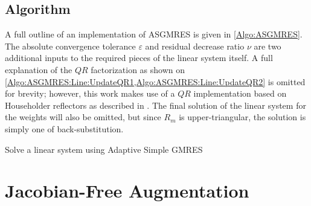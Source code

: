 \documentclass[12pt]{UWMadThesis}
\begin{document}
\subsection{Algorithm}

A full outline of an implementation of ASGMRES is given in \cref{Algo:ASGMRES}.
The absolute convergence tolerance $\varepsilon$ and residual decrease ratio $\nu$ are two additional inputs to the required pieces of the linear system itself.
A full explanation of the $QR$ factorization as shown on \cref{Algo:ASGMRES:Line:UpdateQR1,Algo:ASGMRES:Line:UpdateQR2} is omitted for brevity; however, this work makes use of a $QR$ implementation based on Householder reflectors as described in \cite{datta_numerical_2010}.
The final solution of the linear system for the weights will also be omitted, but since $R_m$ is upper-triangular, the solution is simply one of back-substitution.

\begin{algorithm}[t]
    \caption{Solve a linear system using Adaptive Simple GMRES}
    \label{Algo:ASGMRES}
\end{algorithm}



\clearpage
\section{Jacobian-Free Augmentation}
\end{document}
